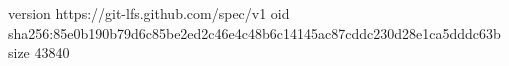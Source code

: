 version https://git-lfs.github.com/spec/v1
oid sha256:85e0b190b79d6c85be2ed2c46e4c48b6c14145ac87cddc230d28e1ca5dddc63b
size 43840
